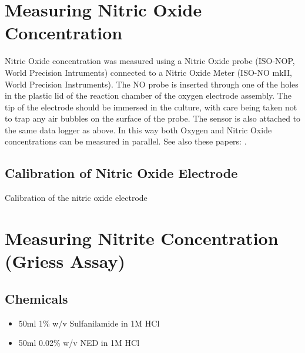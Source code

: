 \section{Measuring Nitric Oxide Concentration}
Nitric Oxide concentration was measured using a Nitric Oxide probe (ISO-NOP, World Precision Intruments) connected to a Nitric Oxide Meter (ISO-NO mkII, World Precision Instruments). The NO probe is inserted through one of the holes in the plastic lid of the reaction chamber of the oxygen electrode assembly. The tip of the electrode should be immersed in the culture, with care being taken not to trap any air bubbles on the surface of the probe. The sensor is also attached to the same data logger as above. In this way both Oxygen and Nitric Oxide concentrations can be measured in parallel.
See also these papers: \citet{Liu2005} \citet{Bedioui2003} \citet{Serpe2007}.
\subsection{Calibration of Nitric Oxide Electrode}
Calibration of the nitric oxide electrode 

\section{Measuring Nitrite Concentration (Griess Assay)}
\cite{DonaldNicholas1957}
\subsection*{Chemicals}
\begin{itemize}
 \item 50ml 1\% w/v Sulfanilamide in 1M HCl
 \item 50ml 0.02\% w/v NED in 1M HCl
\end{itemize}


